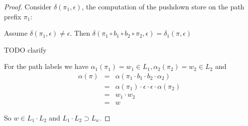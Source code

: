 \begin{proof}
Consider $\delta(\pi_1, \epsilon)$, the computation of the pushdown store on the
path prefix $\pi_1$:

Assume $\delta(\pi_1, \epsilon) \neq \epsilon$. Then $\delta(\pi_1 \circ b_1
\circ b_2 \circ \pi_2, \epsilon) = \delta_1(\pi, \epsilon)$

TODO clarify

For the path labels we have $\alpha_1(\pi_1) = w_1 \in L_1, \alpha_2(\pi_2) =
w_2 \in L_2$ and
\begin{eqnarray*}
\alpha(\pi) &=& \alpha(\pi_1 \cdot b_1 \cdot b_2 \cdot \alpha_2) \\
&=& \alpha(\pi_1) \cdot \epsilon \cdot \epsilon \cdot \alpha(\pi_2) \\
&=& w_1 \cdot w_2 \\
&=& w
\end{eqnarray*}

So $w \in L_1 \cdot L_2$ and $L_1 \cdot L_2 \supset L_{\kappa}$.
\end{proof}


